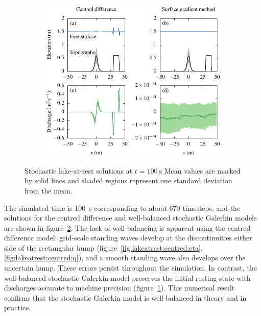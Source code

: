 \begin{figure}
\centering
\begin{subfigure}{\textwidth}
\label{fig:lakeatrest:centred:eta}
\label{fig:lakeatrest:sgm:eta}
\label{fig:lakeatrest:centred:q}
\label{fig:lakeatrest:sgm:q}
\centering
\includegraphics{fig-lakeatrest.pdf}
\end{subfigure}
\caption{Stochastic lake-at-rest solutions at $t = \SI{100}{\second}$ 
Mean values are marked by solid lines and shaded regions represent one standard deviation from the mean.}
\label{fig:lakeatrest}
\end{figure}

The simulated time is \SI{100}{\second} corresponding to about 670 timesteps, and the solutions for the centred difference and well-balanced stochastic Galerkin models are shown in figure~\ref{fig:lakeatrest}.
The lack of well-balancing is apparent using the centred difference model: grid-scale standing waves develop at the discontinuities either side of the rectangular hump (figure~\ref{fig:lakeatrest:centred:eta}, \ref{fig:lakeatrest:centred:q}), and a smooth standing wave also develops over the uncertain hump.
These errors persist throughout the simulation.
In contrast, the well-balanced stochastic Galerkin model preserves the initial resting state with discharges accurate to machine precision (figure~\ref{fig:lakeatrest:sgm:q}).
This numerical result confirms that the stochastic Galerkin model is well-balanced in theory and in practice.

